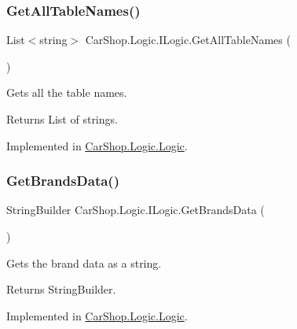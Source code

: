 \subsubsection{\texorpdfstring{Get\+All\+Table\+Names()}{GetAllTableNames()}}
{\footnotesize\ttfamily List$<$string$>$ Car\+Shop.\+Logic.\+I\+Logic.\+Get\+All\+Table\+Names (\begin{DoxyParamCaption}{ }\end{DoxyParamCaption})}



Gets all the table names. 

\begin{DoxyReturn}{Returns}
List of strings.
\end{DoxyReturn}


Implemented in \mbox{\hyperlink{class_car_shop_1_1_logic_1_1_logic_a91f3a4a292e1869a5bdb917dd2378435}{Car\+Shop.\+Logic.\+Logic}}.

\mbox{\label{interface_car_shop_1_1_logic_1_1_i_logic_a3fad1ae2fa55b77fedf2688e9915f376}} 
\subsubsection{\texorpdfstring{Get\+Brands\+Data()}{GetBrandsData()}}
{\footnotesize\ttfamily String\+Builder Car\+Shop.\+Logic.\+I\+Logic.\+Get\+Brands\+Data (\begin{DoxyParamCaption}{ }\end{DoxyParamCaption})}



Gets the brand data as a string. 

\begin{DoxyReturn}{Returns}
String\+Builder.
\end{DoxyReturn}


Implemented in \mbox{\hyperlink{class_car_shop_1_1_logic_1_1_logic_ac41378bc905997f904da5353b20042a0}{Car\+Shop.\+Logic.\+Logic}}.

\mbox{\label{interface_car_shop_1_1_logic_1_1_i_logic_a8e19c6c27464776cae749bb71888716d}} 
